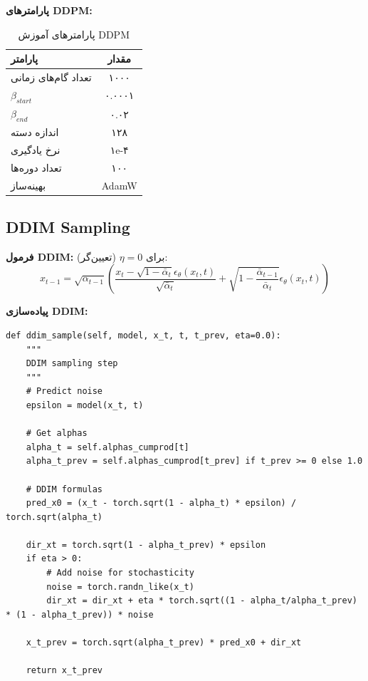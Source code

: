 \textbf{پارامترهای DDPM:}
\begin{table}[H]
    \centering
    \begin{tabular}{lc}
        \toprule
        \textbf{پارامتر} & \textbf{مقدار} \\
        \midrule
        تعداد گام‌های زمانی & ۱۰۰۰ \\
        $\beta_{start}$ & ۰.۰۰۰۱ \\
        $\beta_{end}$ & ۰.۰۲ \\
        اندازه دسته & ۱۲۸ \\
        نرخ یادگیری & ۱e-۴ \\
        تعداد دوره‌ها & ۱۰۰ \\
        بهینه‌ساز & AdamW \\
        \bottomrule
    \end{tabular}
    \caption{پارامترهای آموزش DDPM}
\end{table}

\subsection{DDIM Sampling}

\textbf{فرمول DDIM:}
برای $\eta = 0$ (تعیین‌گر):
\begin{equation}
x_{t-1} = \sqrt{\alpha_{t-1}} \left( \frac{x_t - \sqrt{1-\bar{\alpha}_t} \epsilon_\theta(x_t, t)}{\sqrt{\bar{\alpha}_t}} + \sqrt{1-\frac{\bar{\alpha}_{t-1}}{\bar{\alpha}_t}} \epsilon_\theta(x_t, t) \right)
\end{equation}

\textbf{پیاده‌سازی DDIM:}
\begin{verbatim}
def ddim_sample(self, model, x_t, t, t_prev, eta=0.0):
    """
    DDIM sampling step
    """
    # Predict noise
    epsilon = model(x_t, t)
    
    # Get alphas
    alpha_t = self.alphas_cumprod[t]
    alpha_t_prev = self.alphas_cumprod[t_prev] if t_prev >= 0 else 1.0
    
    # DDIM formulas
    pred_x0 = (x_t - torch.sqrt(1 - alpha_t) * epsilon) / torch.sqrt(alpha_t)
    
    dir_xt = torch.sqrt(1 - alpha_t_prev) * epsilon
    if eta > 0:
        # Add noise for stochasticity
        noise = torch.randn_like(x_t)
        dir_xt = dir_xt + eta * torch.sqrt((1 - alpha_t/alpha_t_prev) * (1 - alpha_t_prev)) * noise
    
    x_t_prev = torch.sqrt(alpha_t_prev) * pred_x0 + dir_xt
    
    return x_t_prev
\end{verbatim}

